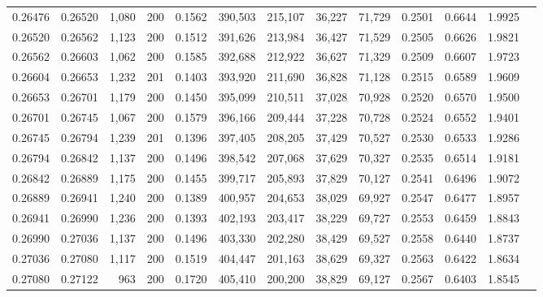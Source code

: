 \begin{tabular}{rrrrrrrrrrrrr}
0.26476 & 0.26520 & 1,080 & 200 &                                     0.1562 & 390,503 & 215,107 &  36,227 &  71,729 & 0.2501 & 0.6644 & 1.9925 \\
0.26520 & 0.26562 & 1,123 & 200 &                                     0.1512 & 391,626 & 213,984 &  36,427 &  71,529 & 0.2505 & 0.6626 & 1.9821 \\
0.26562 & 0.26603 & 1,062 & 200 &                                     0.1585 & 392,688 & 212,922 &  36,627 &  71,329 & 0.2509 & 0.6607 & 1.9723 \\
0.26604 & 0.26653 & 1,232 & 201 &                                     0.1403 & 393,920 & 211,690 &  36,828 &  71,128 & 0.2515 & 0.6589 & 1.9609 \\
0.26653 & 0.26701 & 1,179 & 200 &                                     0.1450 & 395,099 & 210,511 &  37,028 &  70,928 & 0.2520 & 0.6570 & 1.9500 \\
0.26701 & 0.26745 & 1,067 & 200 &                                     0.1579 & 396,166 & 209,444 &  37,228 &  70,728 & 0.2524 & 0.6552 & 1.9401 \\
0.26745 & 0.26794 & 1,239 & 201 &                                     0.1396 & 397,405 & 208,205 &  37,429 &  70,527 & 0.2530 & 0.6533 & 1.9286 \\
0.26794 & 0.26842 & 1,137 & 200 &                                     0.1496 & 398,542 & 207,068 &  37,629 &  70,327 & 0.2535 & 0.6514 & 1.9181 \\
0.26842 & 0.26889 & 1,175 & 200 &                                     0.1455 & 399,717 & 205,893 &  37,829 &  70,127 & 0.2541 & 0.6496 & 1.9072 \\
0.26889 & 0.26941 & 1,240 & 200 &                                     0.1389 & 400,957 & 204,653 &  38,029 &  69,927 & 0.2547 & 0.6477 & 1.8957 \\
0.26941 & 0.26990 & 1,236 & 200 &                                     0.1393 & 402,193 & 203,417 &  38,229 &  69,727 & 0.2553 & 0.6459 & 1.8843 \\
0.26990 & 0.27036 & 1,137 & 200 &                                     0.1496 & 403,330 & 202,280 &  38,429 &  69,527 & 0.2558 & 0.6440 & 1.8737 \\
0.27036 & 0.27080 & 1,117 & 200 &                                     0.1519 & 404,447 & 201,163 &  38,629 &  69,327 & 0.2563 & 0.6422 & 1.8634 \\
0.27080 & 0.27122 &   963 & 200 &                                     0.1720 & 405,410 & 200,200 &  38,829 &  69,127 & 0.2567 & 0.6403 & 1.8545 \\

\end{tabular}
